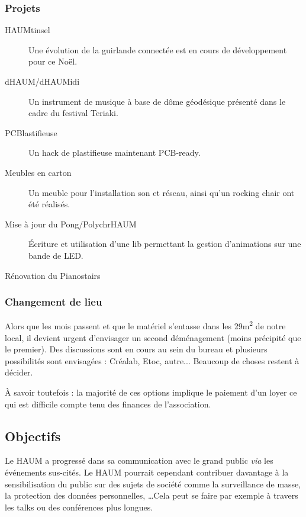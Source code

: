 \documentclass[a4paper, 11pt]{article}
\begin{document}
\subsubsection{Projets}
\label{ssec:projects}

\begin{description}
	\item[HAUMtinsel] Une évolution de la guirlande connectée est en cours de développement pour ce Noël.
	\item[dHAUM/dHAUMidi] Un instrument de musique à base de dôme géodésique présenté dans le cadre du festival Teriaki.
	\item[PCBlastifieuse] Un hack de plastifieuse maintenant PCB-ready.
	\item[Meubles en carton] Un meuble pour l'installation son et réseau, ainsi qu'un rocking chair ont été réalisés.
	\item[Mise à jour du Pong/PolychrHAUM] Écriture et utilisation d'une lib permettant la gestion d'animations sur une bande de LED.
	\item[Rénovation du Pianostairs]
\end{description}

\subsubsection{Changement de lieu}

Alors que les mois passent et que le matériel s'entasse dans les 29m\textsuperscript{2} de notre local, il devient
urgent d'envisager un second déménagement (moins précipité que le premier). Des discussions sont en cours au sein du bureau et plusieurs
possibilités sont envisagées : Créalab, Etoc, autre... Beaucoup de choses restent à décider.

À savoir toutefois : la majorité de ces options implique le paiement d'un loyer ce qui est difficile compte tenu des
finances de l'association.

\subsection{Objectifs}

Le HAUM a progressé dans sa communication avec le grand public \textit{via} les événements sus-cités. Le HAUM pourrait cependant contribuer davantage à la sensibilisation du public sur
des sujets de société comme la surveillance de masse, la protection des données personnelles, \ldots Cela peut se faire
par exemple à travers les talks ou des conférences plus longues.
\end{document}
